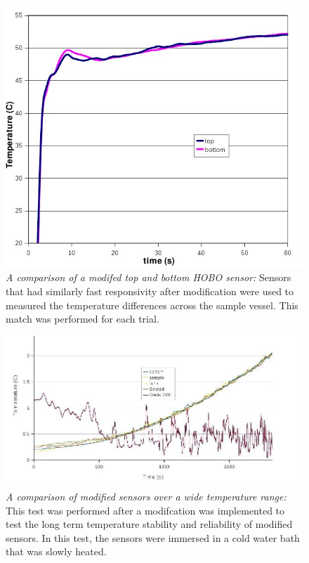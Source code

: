 \begin{center}
\begin{figure}
 \label{sensComp}
 \centering\includegraphics[scale=0.6]{sensorComp1.jpg}
 \caption{\emph{A comparison of a modifed top and bottom HOBO sensor:} Sensors that had similarly fast responsivity after modification were used to measured the temperature differences across the sample vessel. This match was performed for each trial.}
\end{figure}
\end{center}

\begin{center}
\begin{figure}
 \label{sensComp2}
 \centering\includegraphics[scale=0.6]{sensorComp2.jpg}
 \caption{\emph{A comparison of modified sensors over a wide temperature range:} This test was performed after a modifcation was implemented to test the long term temperature stability and reliability of modified sensors. In this test, the sensors were immersed in a cold water bath that was slowly heated.}
\end{figure}
\end{center}

